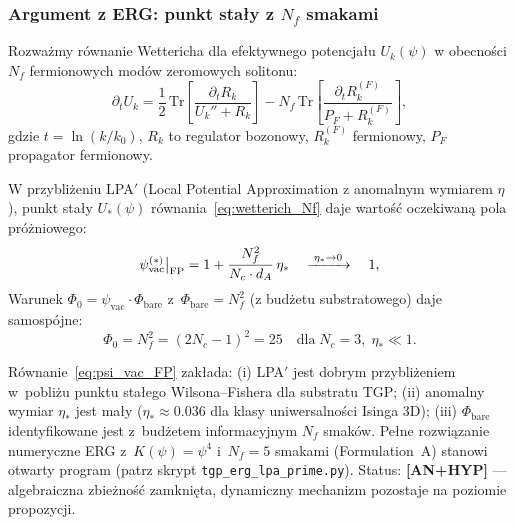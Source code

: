 \subsubsection{Argument z ERG: punkt stały z $N_f$ smakami}
\label{sssec:phi0_erg}

Rozważmy równanie Wettericha dla efektywnego potencjału
$U_k(\psi)$ w obecności $N_f$ fermionowych modów zeromowych
solitonu:
\begin{equation}
  \partial_t U_k = \frac{1}{2}\,\mathrm{Tr}\!\left[
    \frac{\partial_t R_k}{U_k'' + R_k}
  \right]
  - N_f\,\mathrm{Tr}\!\left[
    \frac{\partial_t R_k^{(F)}}{P_F + R_k^{(F)}}
  \right],
  \label{eq:wetterich_Nf}
\end{equation}
gdzie $t = \ln(k/k_0)$, $R_k$ to regulator bozonowy,
$R_k^{(F)}$ fermionowy, $P_F$ propagator fermionowy.

\begin{propozycja}
\label{prop:phi0_erg_selfconsistent}

W przybliżeniu LPA$'$ (Local Potential Approximation z
anomalnym wymiarem $\eta$), punkt stały
$U_*(\psi)$ równania~\eqref{eq:wetterich_Nf}
daje wartość oczekiwaną pola próżniowego:
\begin{equation}
  \psi_{\rm vac}^{(*)}\big|_{\rm FP}
  = 1 + \frac{N_f^2}{N_c \cdot d_A}\,\eta_*
  \quad\xrightarrow{\;\eta_* \to 0\;}\quad 1,
  \label{eq:psi_vac_FP}
\end{equation}
Warunek $\Phi_0 = \psi_\mathrm{vac} \cdot \Phi_\mathrm{bare}$
z~$\Phi_\mathrm{bare} = N_f^2$ (z budżetu substratowego)
daje samospójne:
\begin{equation}
  \boxed{
    \Phi_0 = N_f^2 = (2N_c - 1)^2 = 25
    \quad \text{dla}\; N_c = 3,\; \eta_* \ll 1.
  }
  \label{eq:phi0_erg_result}
\end{equation}
\end{propozycja}

\begin{uwaga}
\label{rem:phi0_erg_status}
Równanie~\eqref{eq:psi_vac_FP} zakłada:
(i) LPA$'$ jest dobrym przybliżeniem w~pobliżu punktu
stałego Wilsona--Fishera dla substratu TGP;
(ii) anomalny wymiar $\eta_*$ jest mały ($\eta_* \approx 0.036$
dla klasy uniwersalności Isinga 3D);
(iii) $\Phi_\mathrm{bare}$ identyfikowane jest z~budżetem
informacyjnym $N_f$ smaków.
Pełne rozwiązanie numeryczne ERG z~$K(\psi) = \psi^4$
i~$N_f = 5$ smakami (Formulation~A) stanowi otwarty program
(patrz skrypt \texttt{tgp\_erg\_lpa\_prime.py}).
Status: \textbf{[AN+HYP]} --- algebraiczna zbieżność zamknięta,
dynamiczny mechanizm pozostaje na poziomie propozycji.
\end{uwaga}

